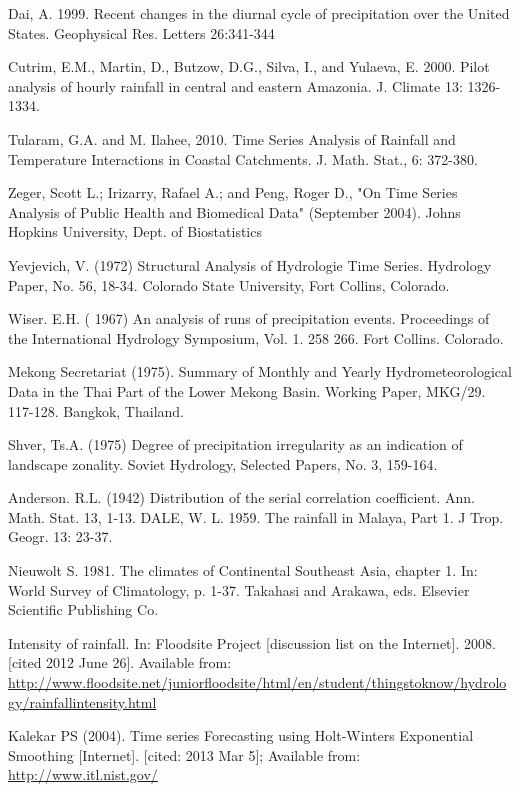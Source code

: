 \begin{thebibliography}{99\kern\bibindent}
 Dai, A. 1999. Recent changes in the diurnal cycle of precipitation over the United States. Geophysical Res. Letters 26:341-344

 Cutrim,  E.M., Martin, D., Butzow, D.G., Silva, I., and Yulaeva, E. 2000. Pilot analysis of hourly rainfall in central and eastern Amazonia. J. Climate 13: 1326-1334.

 Tularam, G.A. and M. Ilahee, 2010. Time Series Analysis of Rainfall and Temperature Interactions in Coastal Catchments. J. Math. Stat., 6: 372-380.

Zeger, Scott L.; Irizarry, Rafael A.; and Peng, Roger D., "On Time Series Analysis of Public Health and Biomedical Data" (September 2004). Johns Hopkins University, Dept. of Biostatistics 

Yevjevich, V. (1972) Structural Analysis of Hydrologie Time Series. Hydrology Paper, No. 56, 18-34. Colorado State University, Fort Collins, Colorado.

Wiser. E.H. ( 1967) An analysis of runs of precipitation events. Proceedings of the International Hydrology Symposium, Vol. 1. 258 266. Fort Collins. Colorado.

Mekong Secretariat (1975). Summary of Monthly and Yearly Hydrometeorological Data in the Thai Part of the Lower Mekong Basin. Working Paper, MKG/29. 117-128. Bangkok, Thailand.

Shver, Ts.A. (1975) Degree of precipitation irregularity as an indication of landscape zonality. Soviet Hydrology, Selected Papers, No. 3, 159-164.

Anderson. R.L. (1942) Distribution of the serial correlation coefficient. Ann. Math. Stat. 13, 1-13.
DALE, W. L. 1959. The rainfall in Malaya, Part 1. J Trop. Geogr. 13: 23-37.

Nieuwolt S. 1981. The climates of Continental Southeast Asia, chapter 1. In: World Survey of Climatology, p. 1-37. Takahasi and Arakawa, eds. Elsevier Scientific Publishing Co.

Intensity of rainfall. In: Floodsite Project [discussion list on the Internet]. 2008. [cited 2012 June 26]. Available from: \url{http://www.floodsite.net/juniorfloodsite/html/en/student/thingstoknow/hydrology/rainfallintensity.html}

 Kalekar PS (2004). Time series Forecasting using Holt-Winters Exponential Smoothing [Internet]. [cited: 2013 Mar 5]; Available from: \url{http://www.itl.nist.gov/}
\end{thebibliography}